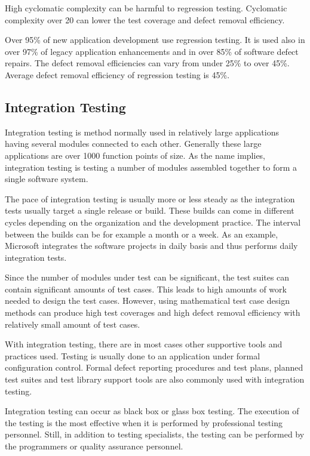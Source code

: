 High cyclomatic complexity can be harmful to regression testing. Cyclomatic complexity over 20 can lower the test coverage and defect removal efficiency.

Over 95\% of new application development use regression testing. It is used also in over 97\% of legacy application enhancements and in over 85\% of software defect repairs. The defect removal efficiencies can vary from under 25\% to over 45\%. Average defect removal efficiency of regression testing is 45\%.


 \subsection{Integration Testing}

Integration testing is method normally used in relatively large applications having several modules connected to each other. Generally these large applications are over 1000 function points of size. As the name implies, integration testing is testing a number of modules assembled together to form a single software system.

The pace of integration testing is usually more or less steady as the integration tests usually target a single release or build. These builds can come in different cycles depending on the organization and the development practice. The interval between the builds can be for example a month or a week. As an example, Microsoft integrates the software projects in daily basis and thus performs daily integration tests.

Since the number of modules under test can be significant, the test suites can contain significant amounts of test cases. This leads to high amounts of work needed to design the test cases. However, using mathematical test case design methods can produce high test coverages and high defect removal efficiency with relatively small amount of test cases. 

With integration testing, there are in most cases other supportive tools and practices used. Testing is usually done to an application under formal configuration control. Formal defect reporting procedures and test plans, planned test suites and test library support tools are also commonly used with integration testing.

Integration testing can occur as black box or glass box testing. The execution of the testing is the most effective when it is performed by professional testing personnel. Still, in addition to testing specialists, the testing can be performed by the programmers or quality assurance personnel. 

